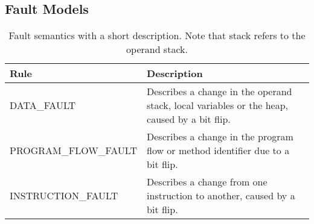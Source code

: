 \subsection{Fault Models}
\begin{table}[H]
\centering
\label{tab:fault}
\begin{tabular}{p{}|p{}}
\textbf{Rule} 					  & \textbf{Description} \\ \hline
DATA\_FAULT             		  & Describes a change in the operand stack, local variables or the heap, caused by a bit flip.\\ \hline 
PROGRAM\_FLOW\_FAULT			  & Describes a change in the program flow or method identifier due to a bit flip. \\ \hline
INSTRUCTION\_FAULT				  & Describes a change from one instruction to another, caused by a bit flip. \\ \hline
\end{tabular}
\caption{Fault semantics with a short description. Note that stack refers to the operand stack.}
\end{table}
